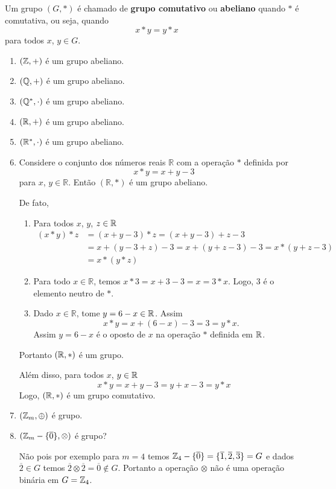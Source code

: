 \begin{definicao}
	Um grupo $(G,*)$ {\'e} chamado de \textbf{grupo comutativo} ou \textbf{abeliano} quando $*$ {\'e} comutativa, ou seja, quando
	\[
		x*y = y*x
	\]
	para todos $x$, $y \in G$.
\end{definicao}

\begin{exemplos}
	\begin{enumerate}[label={\arabic*})]
		\item $(\mathbb{Z},+)$ {\'e} um grupo abeliano.
		\item $(\mathbb{Q},+)$ {\'e} um grupo abeliano.
		\item $(\mathbb{Q}^*,\cdot)$ {\'e} um grupo abeliano.
		\item $(\mathbb{R},+)$ {\'e} um grupo abeliano.
		\item $(\mathbb{R}^*,\cdot)$ {\'e} um grupo abeliano.
		\item Considere o conjunto dos n{\'u}meros reais $\mathbb{R}$ com a opera{\c c}{\~a}o $*$ definida por
		\[
			x*y = x + y - 3
		\]
		para $x$, $y \in \mathbb{R}$. Ent{\~a}o $(\mathbb{R}, *)$ {\'e} um grupo abeliano.
		\begin{solucao}
			De fato,
			\begin{enumerate}[label={\roman*})]
				\item Para todos $x$, $y$, $z \in \mathbb{R}$
				\begin{align*}
					(x*y)*z &= (x+y-3)*z = (x+y-3)+z-3\\
					&= x+(y-3+z)-3 = x+(y+z-3)-3 = x*(y+z-3)\\
					&= x*(y*z)
				\end{align*}

				\item Para todo $x \in \mathbb{R}$, temos $x*3 = x + 3 - 3 = x = 3 * x$. Logo, 3 {\'e} o elemento neutro de $*$.

				\item Dado $x \in \mathbb{R}$, tome $y = 6 - x \in \mathbb{R}$. Assim
				\[
					x*y = x + (6-x)-3 = 3 = y*x.
				\]
				Assim $y = 6 - x$ é o oposto de $x$ na operação $*$ definida em $\mathbb{R}$.
			\end{enumerate}

			Portanto $(\mathbb{R}, *)$ é um grupo.

			Além disso, para todos $x$, $y \in \mathbb{R}$
			\[
				x*y = x + y - 3 = y + x - 3 = y*x
			\]
			Logo, $(\mathbb{R}, *)$ {\'e} um grupo comutativo.
		\end{solucao}

		\item $(\mathbb{Z}_m,\oplus)$ {\'e} grupo.

		\item $(\mathbb{Z}_m-\{\overline{0}\},\otimes)$ {\'e} grupo?
		\begin{solucao}
			Não pois por exemplo para $m = 4$ temos $\mathbb{Z}_4-\{\overline{0}\} = \{\overline{1}, \overline{2}, \overline{3}\} = G$ e dados $\overline{2}\in G$ temos $\overline{2} \otimes \overline{2} = \overline{0} \notin G$. Portanto a operação $\otimes$ não é uma operação binária em $G = \mathbb{Z}_4$.
		\end{solucao}
	\end{enumerate}
\end{exemplos}

